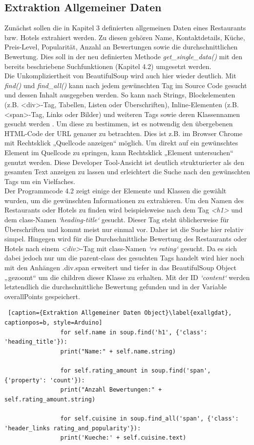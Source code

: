 \documentclass[a4paper,oneside,12pt]{report}
\begin{document}
			\subsection{Extraktion Allgemeiner Daten}			
				Zunächst sollen die in Kapitel 3 definierten allgemeinen Daten eines Restaurants bzw. Hotels extrahiert werden. Zu diesen gehören Name, Kontaktdetails, Küche, Preis-Level, Popularität, Anzahl an Bewertungen sowie die durchschnittlichen Bewertung. Dies soll in der neu definierten Methode \textit{get\_single\_data()}  mit den bereits beschriebene Suchfunktionen (Kapitel 4.2) umgesetzt werden.
				\\ 
				Die Unkompliziertheit von BeautifulSoup wird auch hier wieder deutlich. Mit \textit{find()} und \textit{find\_all()} kann nach jedem gewünschten Tag im Source Code gesucht und dessen Inhalt ausgegeben werden. So kann nach Strings, Blockelementen (z.B. <div>-Tag, Tabellen, Listen oder Überschriften), Inline-Elementen (z.B. <span>-Tag, Links oder Bilder) und weiteren Tags sowie deren Klassennamen gesucht werden \cite{bib-bs4}.
				Um diese zu bestimmen, ist es notwendig den übergebenen HTML-Code der URL genauer zu betrachten. Dies ist z.B. im Browser Chrome mit Rechtsklick „Quellcode anzeigen“ möglich. Um direkt auf ein gewünschtes Element im Quellcode zu springen, kann Rechtsklick „Element untersuchen“ genutzt werden. Diese Developer Tool-Ansicht ist deutlich strukturierter als den gesamten Text anzeigen zu lassen und erleichtert die Suche nach den gewünschten Tags um ein Vielfaches.
				\\
				\newline
				Der Programmcode 4.2 zeigt einige der Elemente und Klassen die gewählt wurden, um die gewünschten Informationen zu extrahieren.
				Um den Namen des Restaurants oder Hotels zu finden wird beispielsweise nach dem Tag \textit{<h1>} und dem class-Namen \textit{‘heading-title‘} gesucht. Dieser Tag steht üblicherweise für Überschriften und kommt meist nur einmal vor. Daher ist die Suche hier relativ simpel. Hingegen wird für die Durchschnittliche Bewertung des Restaurants oder Hotels nach einem \textit{<div>}-Tag mit class-Namen \textit{‘rs rating‘} gesucht. Da es sich dabei jedoch nur um die parent-class des gesuchten Tags handelt wird hier noch mit den Anhängen .div.span erweitert und tiefer in das BeautifulSoup Object „gezoomt“ um die children dieser Klasse zu erhalten. Mit der ID \textit{‘content‘} werden letztendlich die durchschnittliche Bewertung gefunden und in der Variable overallPoints gespeichert.
				\\
				\begin{lstlisting} [caption={Extraktion Allgemeiner Daten Object}\label{exallgdat}, captionpos=b, style=Arduino]
				for self.name in soup.find('h1', {'class': 'heading_title'}):
				print("Name:" + self.name.string)
				
				for self.rating_amount in soup.find('span', {'property': 'count'}):
				print("Anzahl Bewertungen:" + self.rating_amount.string)
				
				for self.cuisine in soup.find_all('span', {'class': 'header_links rating_and_popularity'}):
				print('Kueche:' + self.cuisine.text)
				\end{lstlisting}
				
\end{document}
